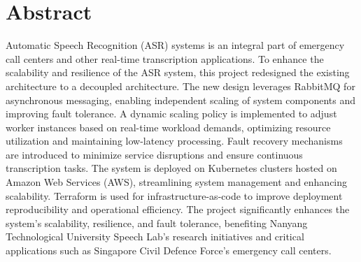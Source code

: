 \chapter*{Abstract}

Automatic Speech Recognition (ASR) systems is an integral part of emergency call centers and other real-time transcription applications. To enhance the scalability and resilience of the ASR system, this project redesigned the existing architecture to a decoupled architecture. The new design leverages RabbitMQ for asynchronous messaging, enabling independent scaling of system components and improving fault tolerance. A dynamic scaling policy is implemented to adjust worker instances based on real-time workload demands, optimizing resource utilization and maintaining low-latency processing. Fault recovery mechanisms are introduced to minimize service disruptions and ensure continuous transcription tasks. The system is deployed on Kubernetes clusters hosted on Amazon Web Services (AWS), streamlining system management and enhancing scalability. Terraform is used for infrastructure-as-code to improve deployment reproducibility and operational efficiency. The project significantly enhances the system's scalability, resilience, and fault tolerance, benefiting Nanyang Technological University Speech Lab's research initiatives and critical applications such as Singapore Civil Defence Force's emergency call centers.
